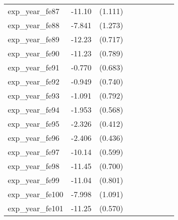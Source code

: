 {\begin{tabular}{l*{4}{cc}}
exp\_year\_fe87&   -11.10\sym{***}&  (1.111)&                  &         &                  &         &                  &         \\
exp\_year\_fe88&   -7.841\sym{***}&  (1.273)&                  &         &                  &         &                  &         \\
exp\_year\_fe89&   -12.23\sym{***}&  (0.717)&                  &         &                  &         &                  &         \\
exp\_year\_fe90&   -11.23\sym{***}&  (0.789)&                  &         &                  &         &                  &         \\
exp\_year\_fe91&   -0.770         &  (0.683)&                  &         &                  &         &                  &         \\
exp\_year\_fe92&   -0.949         &  (0.740)&                  &         &                  &         &                  &         \\
exp\_year\_fe93&   -1.091         &  (0.792)&                  &         &                  &         &                  &         \\
exp\_year\_fe94&   -1.953\sym{***}&  (0.568)&                  &         &                  &         &                  &         \\
exp\_year\_fe95&   -2.326\sym{***}&  (0.412)&                  &         &                  &         &                  &         \\
exp\_year\_fe96&   -2.406\sym{***}&  (0.436)&                  &         &                  &         &                  &         \\
exp\_year\_fe97&   -10.14\sym{***}&  (0.599)&                  &         &                  &         &                  &         \\
exp\_year\_fe98&   -11.45\sym{***}&  (0.700)&                  &         &                  &         &                  &         \\
exp\_year\_fe99&   -11.04\sym{***}&  (0.801)&                  &         &                  &         &                  &         \\
exp\_year\_fe100&   -7.998\sym{***}&  (1.091)&                  &         &                  &         &                  &         \\
exp\_year\_fe101&   -11.25\sym{***}&  (0.570)&                  &         &                  &         &                  &         \\

\end{tabular}}

